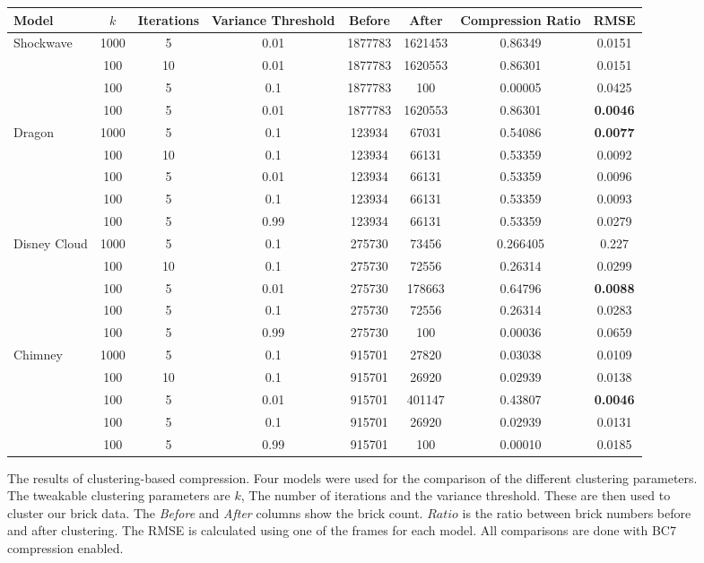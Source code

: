 \begin{figure}[H]
{    \begin{tabular}{|l|ccc|cccc|}
        \toprule
        \hline
        Model & $k$ & Iterations & Variance Threshold & Before & After & Compression Ratio & RMSE \\
        \hline
        \midrule
        Shockwave & 1000 & 5 & 0.01 & 1877783 & 1621453 & 0.86349 & 0.0151 \\
        & 100 & 10 & 0.01 & 1877783 & 1620553 & 0.86301 & 0.0151 \\
        & 100 & 5 & 0.1 & 1877783 & 100 & 0.00005 & 0.0425 \\
        & 100 & 5 & 0.01 & 1877783 & 1620553 & 0.86301 & \textbf{0.0046} \\
        \hline
        \midrule
        Dragon & 1000 & 5 & 0.1 & 123934 & 67031 & 0.54086 & \textbf{0.0077} \\
        & 100 & 10 & 0.1 & 123934 & 66131 & 0.53359 & 0.0092 \\
        & 100 & 5 & 0.01 & 123934 & 66131 & 0.53359 & 0.0096 \\
        & 100 & 5 & 0.1 & 123934 & 66131 & 0.53359 & 0.0093 \\
        & 100 & 5 & 0.99 & 123934 & 66131 & 0.53359 & 0.0279 \\
        \hline
        \midrule
        Disney Cloud & 1000 & 5 & 0.1 & 275730 & 73456 & 0.266405 & 0.227 \\
        & 100 & 10 & 0.1 & 275730 & 72556 & 0.26314 & 0.0299 \\
        & 100 & 5 & 0.01 & 275730 & 178663 & 0.64796 & \textbf{0.0088} \\
        & 100 & 5 & 0.1 & 275730 & 72556 & 0.26314 & 0.0283 \\
        & 100 & 5 & 0.99 & 275730 & 100 & 0.00036 & 0.0659 \\
        \hline
        \midrule
        Chimney & 1000 & 5 & 0.1 & 915701 & 27820 & 0.03038 & 0.0109 \\
        & 100 & 10 & 0.1 & 915701 & 26920 & 0.02939 & 0.0138 \\
        & 100 & 5 & 0.01 & 915701 & 401147 & 0.43807 & \textbf{0.0046} \\
        & 100 & 5 & 0.1 & 915701 & 26920 & 0.02939 & 0.0131 \\
        & 100 & 5 & 0.99 & 915701 & 100 & 0.00010 & 0.0185 \\
        \hline
        \bottomrule
      \end{tabular}
    \label{tab:block_compression_visualized:table}
    }

    \caption{The results of clustering-based compression. Four models were used for the comparison of the different clustering parameters. The tweakable clustering parameters are $k$, The number of iterations and the variance threshold. These are then used to cluster our brick data. The \textit{Before} and \textit{After} columns show the brick count. $Ratio$ is the ratio between brick numbers before and after clustering. The RMSE is calculated using one of the frames for each model. All comparisons are done with BC7 compression enabled.} \label{fig:block_compression_visualized}
\end{figure}

